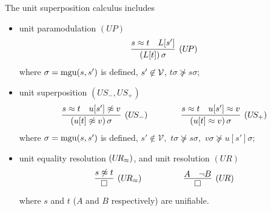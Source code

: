\begin{definition}\label{def:unit-superpositin-calculus}
	The {\myem unit superposition calculus} includes 
	\begin{itemize}
		\item unit paramodulation $(U\!P)$
		\begin{gather*}
		\infer
		[(U\!P)]
		{(L[t])\,\sigma}
		{s\mEQ t&L[s']}
		\end{gather*}
		where $\sigma=\operatorname{mgu}(s,s')$ is defined,
		$s'\not\in{\mathcal V}$,
		$t\sigma\not\succcurlyeq s\sigma$;
		\item unit superposition $(U\!S_-,U\!S_+)$
		\begin{gather*}
		\infer
		[(U\!S_-)]
		{(u[t]\mNE v)\,\sigma}
		{s\mEQ t&u[s']\mNE v}
		\qquad\qquad
		\infer
		[(U\!S_+)]
		{(u[t]\mEQ v)\,\sigma}
		{s\mEQ t&u[s']\mEQ v}
		\end{gather*}
		where $\sigma=\operatorname{mgu}(s,s')$ is defined,
		$s'\not\in\mathcal{V},$
		$t\sigma\not\succcurlyeq s\sigma,$
		$v\sigma\not\succcurlyeq u[s']\sigma$;
		\item unit equality resolution $(U\!R_\approx)$, and unit resolution $(U\!R)$
		\begin{gather*}
		\infer
		[(U\!R_\mEQ)]
		{\emptyclause}
		{s\mNE t}
		\quad\quad\quad\qquad
		\infer
		[(U\!R)]
		{\emptyclause}
		{A&\lnot B}
		\end{gather*}
		where $s$ and $t$ ($A$ and $B$ respectively) are unifiable.
	\end{itemize}
\end{definition}

